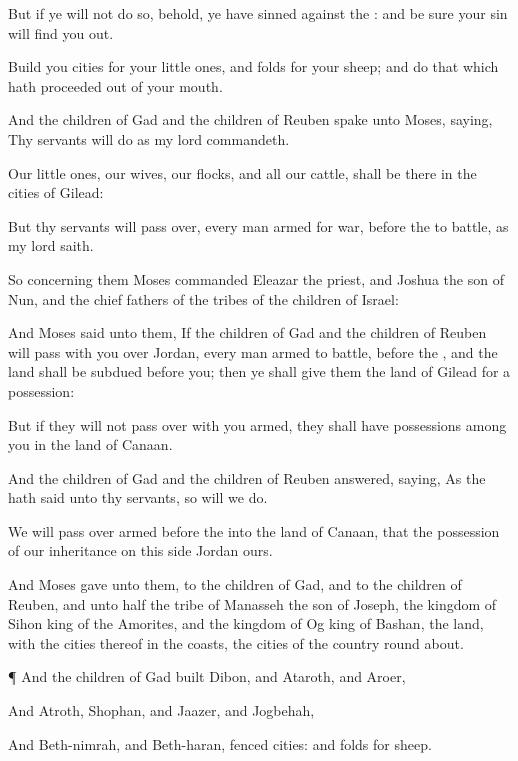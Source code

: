 {But if ye will not do
so, behold, ye have
sinned against the
{}: and be
sure your
sin will find you
out.

Build you
cities for your little
ones, and
folds for your
sheep; and
do that which hath
proceeded out of your
mouth.

And the
children of
Gad and the
children of
Reuben
spake unto
Moses,
saying, Thy
servants will
do as my
lord
commandeth.

Our little
ones, our
wives, our
flocks, and all our
cattle, shall be there in the
cities of
Gilead:

But thy
servants will pass
over, every man
armed for
war,
before the
{} to
battle, as my
lord
saith.


\par }{\PP {}So concerning them
Moses
commanded
Eleazar the
priest, and
Joshua the
son of
Nun, and the
chief
fathers of the
tribes of the
children of
Israel:

And
Moses
said unto them, If the
children of
Gad and the
children of
Reuben will pass with you
over
Jordan, every man
armed to
battle,
before the
{}, and the
land shall be
subdued
before you; then ye shall
give them the
land of
Gilead for a
possession:

But if they will not pass
over with you
armed, they shall have
possessions
among you in the
land of
Canaan.

And the
children of
Gad and the
children of
Reuben
answered,
saying, As the
{} hath
said unto thy
servants, so will we
do.

We
will pass
over
armed
before the
{} into the
land of
Canaan, that the
possession of our
inheritance on this
side
Jordan
{} ours.

And
Moses
gave unto them,
{} to the
children of
Gad, and to the
children of
Reuben, and unto
half the
tribe of
Manasseh the
son of
Joseph, the
kingdom of
Sihon
king of the
Amorites, and the
kingdom of
Og
king of
Bashan, the
land, with the
cities thereof in the
coasts,
{} the
cities of the
country round
about.


\par }{\PP {}¶ And the
children of
Gad
built
Dibon, and
Ataroth, and
Aroer,

And Atroth,
Shophan, and
Jaazer, and
Jogbehah,

And
Beth-nimrah, and
Beth-haran,
fenced
cities: and
folds for
sheep.

}
